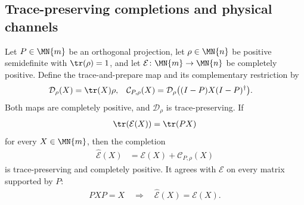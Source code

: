 \subsection{Trace-preserving completions and physical channels}

\begin{lemma}
    \label{thm:matrix_support_completion_cptp}
    \leanok

    Let $P\in\MN{m}$ be an orthogonal projection, let
    $\rho\in\MN{n}$ be positive semidefinite with $\tr(\rho)=1$, and let
    $\mathcal E\colon\MN{m}\to\MN{n}$ be completely positive.  Define the
    trace-and-prepare map and its complementary restriction by
    \begin{align}
        \mathcal D_\rho(X)
         & =\tr(X)\rho,
         &
        \mathcal C_{P,\rho}(X)
         & =\mathcal D_\rho\bigl((I-P)X(I-P)^\dagger\bigr).
        \label{eq:matrix_support_complement_map}
    \end{align}
    Both maps are completely positive, and $\mathcal D_\rho$ is
    trace-preserving.  If
    \begin{align}
        \tr(\mathcal E(X))=\tr(PX)
        \label{eq:matrix_support_map_trace}
    \end{align}
    for every $X\in\MN{m}$, then the completion
    \begin{align}
        \widehat{\mathcal E}(X)
         & =\mathcal E(X)+\mathcal C_{P,\rho}(X)
        \label{eq:matrix_support_completion}
    \end{align}
    is trace-preserving and completely positive.  It agrees with
    $\mathcal E$ on every matrix supported by $P$:
    \begin{align}
        PXP=X
        \quad\Longrightarrow\quad
        \widehat{\mathcal E}(X)=\mathcal E(X).
        \label{eq:matrix_support_completion_agreement}
    \end{align}
\end{lemma}

